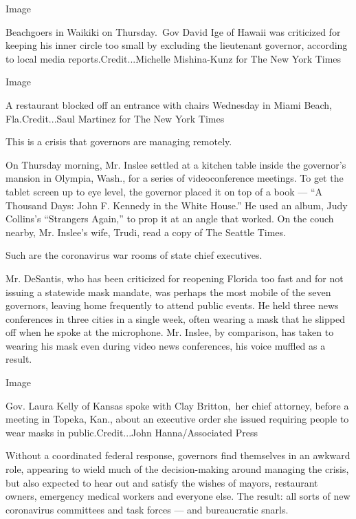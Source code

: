 Image

Beachgoers in Waikiki on Thursday.~Gov David Ige of Hawaii was
criticized for keeping his inner circle too small by excluding the
lieutenant governor, according to local media reports.Credit...Michelle
Mishina-Kunz for The New York Times

Image

A restaurant blocked off an entrance with chairs Wednesday in Miami
Beach, Fla.Credit...Saul Martinez for The New York Times

This is a crisis that governors are managing remotely.

On Thursday morning, Mr. Inslee settled at a kitchen table inside the
governor's mansion in Olympia, Wash., for a series of videoconference
meetings. To get the tablet screen up to eye level, the governor placed
it on top of a book --- ``A Thousand Days: John F. Kennedy in the White
House.'' He used an album, Judy Collins's ``Strangers Again,'' to prop
it at an angle that worked. On the couch nearby, Mr. Inslee's wife,
Trudi, read a copy of The Seattle Times.

Such are the coronavirus war rooms of state chief executives.

Mr. DeSantis, who has been criticized for reopening Florida too fast and
for not issuing a statewide mask mandate, was perhaps the most mobile of
the seven governors, leaving home frequently to attend public events. He
held three news conferences in three cities in a single week, often
wearing a mask that he slipped off when he spoke at the microphone. Mr.
Inslee, by comparison, has taken to wearing his mask even during video
news conferences, his voice muffled as a result.

Image

Gov. Laura Kelly of Kansas spoke with Clay Britton,~her chief attorney,
before a meeting in Topeka, Kan., about an executive order she issued
requiring people to wear masks in public.Credit...John Hanna/Associated
Press

Without a coordinated federal response, governors find themselves in an
awkward role, appearing to wield much of the decision-making around
managing the crisis, but also expected to hear out and satisfy the
wishes of mayors, restaurant owners, emergency medical workers and
everyone else. The result: all sorts of new coronavirus committees and
task forces --- and bureaucratic snarls.

\href{https://www.nytimes.com/news-event/coronavirus?action=click\&pgtype=Article\&state=default\&region=MAIN_CONTENT_3\&context=storylines_faq}{}


